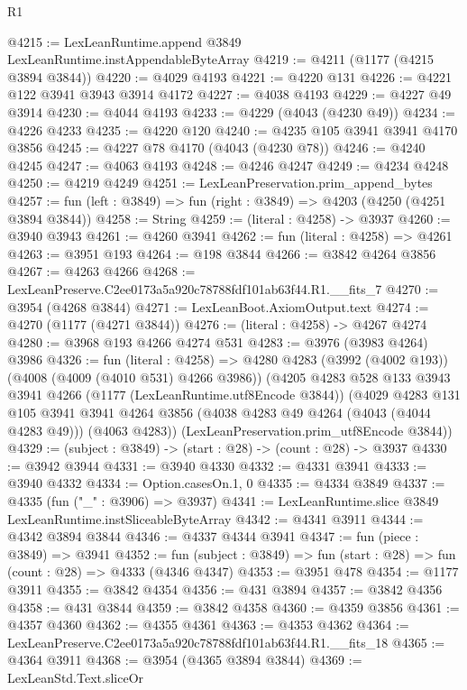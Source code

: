 \begin{lexlean}{R1}
\begin{coremodule}
@4215 := LexLeanRuntime.append @3849 LexLeanRuntime.instAppendableByteArray
@4219 := @4211 (@1177 (@4215 @3894 @3844))
@4220 := @4029 @4193
@4221 := @4220 @131
@4226 := @4221 @122 @3941 @3943 @3914 @4172
@4227 := @4038 @4193
@4229 := @4227 @49 @3914
@4230 := @4044 @4193
@4233 := @4229 (@4043 (@4230 @49))
@4234 := @4226 @4233
@4235 := @4220 @120
@4240 := @4235 @105 @3941 @3941 @4170 @3856
@4245 := @4227 @78 @4170 (@4043 (@4230 @78))
@4246 := @4240 @4245
@4247 := @4063 @4193
@4248 := @4246 @4247
@4249 := @4234 @4248
@4250 := @4219 @4249
@4251 := LexLeanPreservation.prim_append_bytes
@4257 := fun (left : @3849) => fun (right : @3849) => @4203 (@4250 (@4251 @3894 @3844))
@4258 := String
@4259 := (literal : @4258) -> @3937
@4260 := @3940 @3943
@4261 := @4260 @3941
@4262 := fun (literal : @4258) => @4261
@4263 := @3951 @193
@4264 := @198 @3844
@4266 := @3842 @4264 @3856
@4267 := @4263 @4266
@4268 := LexLeanPreserve.C2ee0173a5a920c78788fdf101ab63f44.R1.__fits_7
@4270 := @3954 (@4268 @3844)
@4271 := LexLeanBoot.AxiomOutput.text
@4274 := @4270 (@1177 (@4271 @3844))
@4276 := (literal : @4258) -> @4267 @4274
@4280 := @3968 @193 @4266 @4274 @531
@4283 := @3976 (@3983 @4264) @3986
@4326 := fun (literal : @4258) =>
  @4280
    @4283
    (@3992 (@4002 @193))
    (@4008 (@4009 (@4010 @531) @4266 @3986))
    (@4205
      @4283
      @528
      @133
      @3943
      @3941
      @4266
      (@1177 (LexLeanRuntime.utf8Encode @3844))
      (@4029
        @4283
        @131
        @105
        @3941
        @3941
        @4264
        @3856
        (@4038 @4283 @49 @4264 (@4043 (@4044 @4283 @49)))
        (@4063 @4283))
      (LexLeanPreservation.prim_utf8Encode @3844))
@4329 := (subject : @3849) -> (start : @28) -> (count : @28) -> @3937
@4330 := @3942 @3944
@4331 := @3940 @4330
@4332 := @4331 @3941
@4333 := @3940 @4332
@4334 := Option.casesOn.{1, 0}
@4335 := @4334 @3849
@4337 := @4335 (fun ("_" : @3906) => @3937)
@4341 := LexLeanRuntime.slice @3849 LexLeanRuntime.instSliceableByteArray
@4342 := @4341 @3911
@4344 := @4342 @3894 @3844
@4346 := @4337 @4344 @3941
@4347 := fun (piece : @3849) => @3941
@4352 := fun (subject : @3849) => fun (start : @28) => fun (count : @28) => @4333 (@4346 @4347)
@4353 := @3951 @478
@4354 := @1177 @3911
@4355 := @3842 @4354
@4356 := @431 @3894
@4357 := @3842 @4356
@4358 := @431 @3844
@4359 := @3842 @4358
@4360 := @4359 @3856
@4361 := @4357 @4360
@4362 := @4355 @4361
@4363 := @4353 @4362
@4364 := LexLeanPreserve.C2ee0173a5a920c78788fdf101ab63f44.R1.__fits_18
@4365 := @4364 @3911
@4368 := @3954 (@4365 @3894 @3844)
@4369 := LexLeanStd.Text.sliceOr

\end{coremodule}
\end{lexlean}
